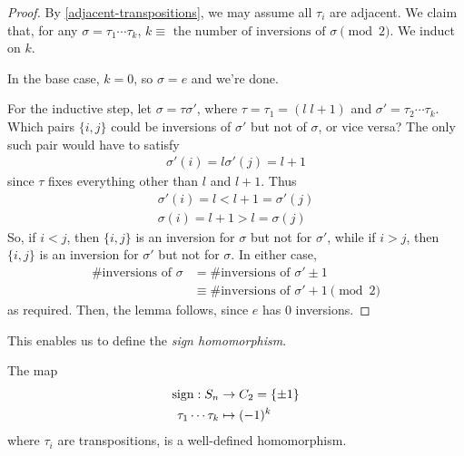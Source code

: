 \documentclass{../../template/note}
\begin{document}
    
    
    \begin{proof}
        By \cref{adjacent-transpositions}, we may assume all \(\tau_i\) are adjacent. We claim that, for any \(\sigma = \tau_1 \cdots \tau_k\), \(k \equiv \text{ the number of inversions of } \sigma \pmod 2\). We induct on \(k\).
        
        In the base case, \(k=0\), so \(\sigma = e\) and we're done.
        
        For the inductive step, let \(\sigma = \tau \sigma'\), where \(\tau = \tau_1 = (l \; l+1)\) and \(\sigma' = \tau_2 \cdots \tau_k\). Which pairs \(\{i, j\}\) could be inversions of \(\sigma'\) but not of \(\sigma\), or vice versa? The only such pair would have to satisfy
        \begin{align*}
            \sigma'(i) = l 
            \sigma'(j) = l+1
        \end{align*}
        since \(\tau\) fixes everything other than \(l\) and \(l+1\). Thus
        \begin{align*}
            \sigma'(i) = l < l + 1 = \sigma'(j) \\
            \sigma(i) = l+1 > l = \sigma(j)
        \end{align*}
        So, if \(i < j\), then \(\{i, j\}\) is an inversion for \(\sigma\) but not for \(\sigma'\), while if \(i > j\), then \(\{i, j\}\) is an inversion for \(\sigma'\) but not for \(\sigma\). In either case,
        \begin{align*}
            \#\text{inversions of }\sigma &= \#\text{inversions of }\sigma' \pm 1 \\
            &\equiv \#\text{inversions of }\sigma' + 1 \pmod 2
        \end{align*}
        as required. Then, the lemma follows, since \(e\) has 0 inversions.
    \end{proof}
    
    This enables us to define the \emph{sign homomorphism}.
    
    \begin{theorem}
        The map
        \begin{align*}
            \operatorname{sign}: S_n &\to C_2 = \{\pm 1\} \\
            \tau_1 \cdots \tau_k &\mapsto (-1)^k
        \end{align*}
        where \(\tau_i\) are transpositions, is a well-defined homomorphism.
    \end{theorem}
    
\end{document}
